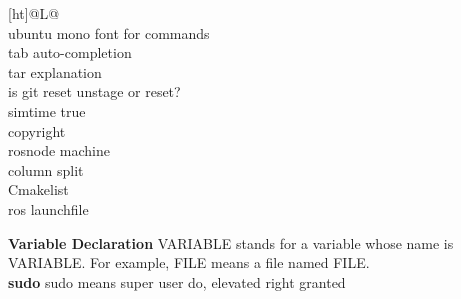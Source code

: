 \documentclass[a4paper]{article}
\newcommand{\hlx}{\\ \midrule[0.3ex]}
\newcommand{\mytoprule}{\toprule[0.5ex]}
\newcommand{\mybottomrule}{\bottomrule[0.5ex]}
\newcommand{\spacebtwtables}{\newline \vspace*{1em} \newline}
\newcommand{\headbf}[1]{\Large\textbf{#1}}
\begin{document}
\begin{multicols*}{3}
\begin{tabularx}{\linewidth}[ht]{@{}L@{}}
	\multicolumn{1}{@{}l@{}}{\headbf{TODO}} \\
	\mytoprule
	ubuntu mono font for commands \hlx
	tab auto-completion \hlx
	tar explanation \\
	is git reset unstage or reset? \\
	simtime true\\
	copyright\\
	rosnode machine \\
	column split\\
	Cmakelist \\
	ros launchfile \\
	\mybottomrule
\end{tabularx}
\spacebtwtables
\textbf{Variable Declaration} VARIABLE stands for a variable whose name is VARIABLE. For example, FILE means a file named FILE. \\
\textbf{sudo} sudo means super user do, elevated right granted \\
\spacebtwtables

\end{multicols*}
\end{document}
